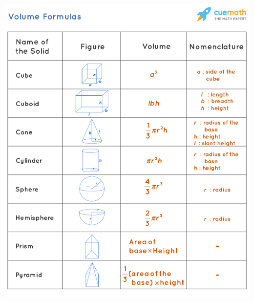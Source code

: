 \documentclass[8pt]{article}
\begin{document}
\begin{multicols*}{3}
\begin{minipage}{\linewidth-2cm}
      \includegraphics[width=\linewidth]{./media/volume.png}
    \end{minipage}
    \newpage
    \begin{minipage}{\linewidth-2cm}

\end{minipage}
\end{multicols*}
\end{document}
